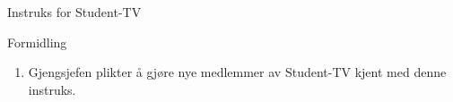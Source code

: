 \begin{instruks*}{Instruks for Student-TV}
    \begin{instruksledd}{Formidling}
        \begin{enumerate}
            \item Gjengsjefen plikter å gjøre nye medlemmer av Student-TV kjent med denne
                instruks.
        \end{enumerate}
    \end{instruksledd}


\end{instruks*}


